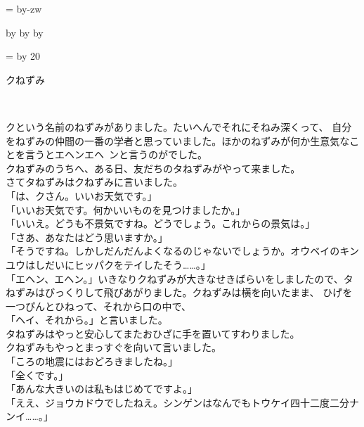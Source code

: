 \documentclass[
a4paper,
10pt,
book]
{tarticle}
\makeatletter
\def\mojiparline#1{
    \newcounter{mpl}
    \setcounter{mpl}{#1}
    \@tempdima=\linewidth
    \advance\@tempdima by-\value{mpl}zw
    \addtocounter{mpl}{-1}
    \divide\@tempdima by \value{mpl}
    \advance\kanjiskip by\@tempdima
    \advance\parindent by\@tempdima
    }
\def\linesparpage#1{
        \baselineskip=\textheight
        \divide\baselineskip by #1
        }
\makeatother
\begin{document}
\Large

\mojiparline{42}
\linesparpage{20}

{} %
\mcfamily %

\thispagestyle{empty}
{\fontsize{30pt}{24pt}\selectfont
クねずみ\\
\begin{flushright}
    \\
\end{flushright}
}
\newpage
\setcounter{page}{1}



\indent クという名前のねずみがありました。たいへんでそれにそねみ深くって、
自分をねずみの仲間の一番の学者と思っていました。ほかのねずみが何か生意気なことを言うとエヘンエヘ~ンと言うのがでした。\\
\indent クねずみのうちへ、ある日、友だちのタねずみがやって来ました。\\
\indent さてタねずみはクねずみに言いました。\\
「は、クさん。いいお天気です。」\\
「いいお天気です。何かいいものを見つけましたか。」\\
「いいえ。どうも不景気ですね。どうでしょう。これからの景気は。」\\
「さあ、あなたはどう思いますか。」\\
「そうですね。しかしだんだんよくなるのじゃないでしょうか。オウベイのキンユウはしだいにヒッパクをテイしたそう……。」\\
「エヘン、エヘン。」いきなりクねずみが大きなせきばらいをしましたので、タねずみはびっくりして飛びあがりました。クねずみは横を向いたまま、
ひげを一つぴんとひねって、それから口の中で、\\
「ヘイ、それから。」と言いました。\\
\indent タねずみはやっと安心してまたおひざに手を置いてすわりました。\\
\indent クねずみもやっとまっすぐを向いて言いました。\\
「ころの地震にはおどろきましたね。」\\
「全くです。」\\
「あんな大きいのは私もはじめてですよ。」\\
「ええ、ジョウカドウでしたねえ。シンゲンはなんでもトウケイ四十二度二分ナンイ……。」\\
\end{document}
